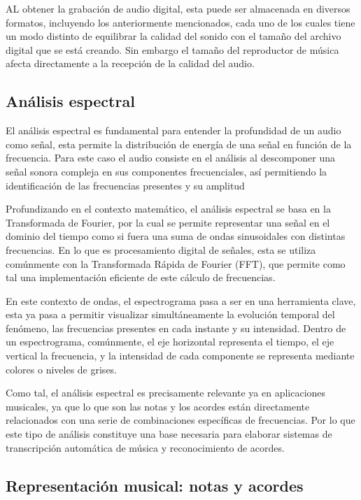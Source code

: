 AL obtener la grabación de audio digital, esta puede ser almacenada en diversos formatos, incluyendo los anteriormente mencionados, cada uno de los cuales tiene un modo distinto de equilibrar la calidad del sonido con el tamaño del archivo digital que se está creando. Sin embargo el tamaño del reproductor de música afecta directamente a la recepción de la calidad del audio.


\subsection{Análisis espectral}
El análisis espectral es fundamental para entender la profundidad de un audio como señal, esta permite la distribución de energía de una señal en función de la frecuencia. Para este caso el audio consiste en el análisis al descomponer una señal sonora compleja en sus componentes frecuenciales, así permitiendo la identificación de las frecuencias presentes y su amplitud

Profundizando en el contexto matemático, el análisis espectral se basa en la Transformada de Fourier, por la cual se permite representar una señal en el dominio del tiempo como si fuera una suma de ondas sinusoidales con distintas frecuencias. En lo que es procesamiento digital de señales, esta se utiliza comúnmente con la Transformada Rápida de Fourier (FFT), que permite como tal una implementación eficiente de este cálculo de frecuencias.

En este contexto de ondas, el espectrograma pasa a ser en una herramienta clave, esta ya pasa a permitir visualizar simultáneamente la evolución temporal del fenómeno, las frecuencias presentes en cada instante y su intensidad. Dentro de un espectrograma, comúnmente, el eje horizontal representa el tiempo, el eje vertical la frecuencia, y la intensidad de cada componente se representa mediante colores o niveles de grises.

Como tal, el análisis espectral es precisamente relevante ya en aplicaciones musicales, ya que lo que son las notas y los acordes están directamente relacionados con una serie de combinaciones específicas de frecuencias. Por lo que este tipo de análisis constituye una base necesaria para elaborar sistemas de transcripción automática de música y reconocimiento de acordes.


\subsection{Representación musical: notas y acordes}

